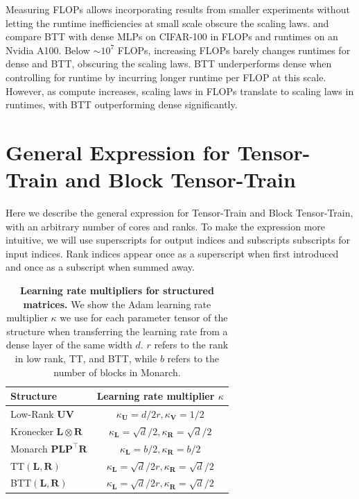 \documentclass{article}
\newcommand{\mbf}[1]{{\boldsymbol{\mathbf{#1}}}}
\newcommand{\bm}{\mbf}
\theoremstyle{plain}
\theoremstyle{definition}
\theoremstyle{remark}
\begin{document}
Measuring FLOPs allows incorporating results from smaller experiments without letting the runtime inefficiencies at small scale obscure the scaling laws.   and  compare BTT with dense MLPs on CIFAR-100 in FLOPs and runtimes on an Nvidia A100. Below $\sim10^7$ FLOPs, increasing FLOPs barely changes runtimes for dense and BTT, obscuring the scaling laws. BTT underperforms dense when controlling for runtime by incurring longer runtime per FLOP at this scale. However, as compute increases, scaling laws in FLOPs translate to scaling laws in runtimes, with BTT outperforming dense significantly.



\section{General Expression for Tensor-Train and Block Tensor-Train} \label{app:general}
Here we describe the general expression for Tensor-Train and Block Tensor-Train, with an arbitrary number of cores and ranks. To make the expression more intuitive, we will use superscripts for output indices and subscripts subscripts for input indices. Rank indices appear once as a superscript when first introduced and once as a subscript when summed away.


\begin{table}[!t]
    \centering
    \begin{tabular}{l|c}
       Structure & Learning rate multiplier $\kappa$ \\
      \hline
      Low-Rank $\bm{U} \bm{V}$ & $\kappa_\bm{U} = d/2r, \kappa_\bm{V} = 1/2$ \\
      \hline
      Kronecker $\bm{L} \otimes \bm{R}$ & $\kappa_\bm{L} = \sqrt{d}/2, \kappa_\bm{R} = \sqrt{d}/2$ \\
      \hline
      Monarch $\bm{P} \bm{L} \bm{P}^{\top} \bm{R}$ & $\kappa_\bm{L} = b/2, \kappa_\bm{R} = b/2$ \\
      \hline
      TT$(\bm{L},\bm{R})$ & $\kappa_\bm{L} = \sqrt{d}/2r, \kappa_\bm{R} = \sqrt{d}/2$ \\
      \hline
      BTT$(\bm{L},\bm{R})$ & $\kappa_\bm{L} = \sqrt{d}/2r, \kappa_\bm{R} = \sqrt{d}/2$ \\
    \end{tabular}
    \caption{
      \textbf{Learning rate multipliers for structured matrices.} We show the Adam learning rate multiplier $\kappa$ we use for each parameter tensor of the structure when transferring the learning rate from a dense layer of the same width $d.$ $r$ refers to the rank in low rank, TT, and BTT, while $b$ refers to the number of blocks in Monarch. 
    }
    \label{tab:structures_mup}
\end{table}
\end{document}
